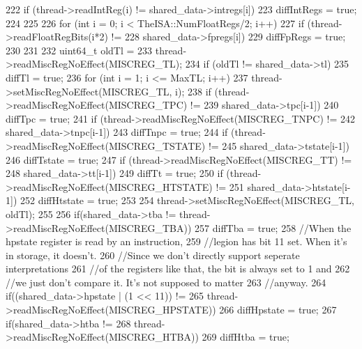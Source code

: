 \begin{DoxyCode}
{{{{{222                     if (thread->readIntReg(i) != shared_data->intregs[i]) {
223                         diffIntRegs = true;
224                     }
225                 }
226                 for (int i = 0; i < TheISA::NumFloatRegs/2; i++) {
227                     if (thread->readFloatRegBits(i*2) !=
228                             shared_data->fpregs[i]) {
229                         diffFpRegs = true;
230                     }
231                 }
232                         uint64_t oldTl =
233                             thread->readMiscRegNoEffect(MISCREG_TL);
234                 if (oldTl != shared_data->tl)
235                     diffTl = true;
236                 for (int i = 1; i <= MaxTL; i++) {
237                     thread->setMiscRegNoEffect(MISCREG_TL, i);
238                     if (thread->readMiscRegNoEffect(MISCREG_TPC) !=
239                             shared_data->tpc[i-1])
240                         diffTpc = true;
241                     if (thread->readMiscRegNoEffect(MISCREG_TNPC) !=
242                             shared_data->tnpc[i-1])
243                         diffTnpc = true;
244                     if (thread->readMiscRegNoEffect(MISCREG_TSTATE) !=
245                             shared_data->tstate[i-1])
246                         diffTstate = true;
247                     if (thread->readMiscRegNoEffect(MISCREG_TT) !=
248                             shared_data->tt[i-1])
249                         diffTt = true;
250                     if (thread->readMiscRegNoEffect(MISCREG_HTSTATE) !=
251                             shared_data->htstate[i-1])
252                         diffHtstate = true;
253                 }
254                 thread->setMiscRegNoEffect(MISCREG_TL, oldTl);
255 
256                 if(shared_data->tba != thread->readMiscRegNoEffect(MISCREG_TBA))
257                     diffTba = true;
258                 //When the hpstate register is read by an instruction,
259                 //legion has bit 11 set. When it's in storage, it doesn't.
260                 //Since we don't directly support seperate interpretations
261                 //of the registers like that, the bit is always set to 1 and
262                 //we just don't compare it. It's not supposed to matter
263                 //anyway.
264                 if((shared_data->hpstate | (1 << 11)) !=
265                         thread->readMiscRegNoEffect(MISCREG_HPSTATE))
266                     diffHpstate = true;
267                 if(shared_data->htba !=
268                         thread->readMiscRegNoEffect(MISCREG_HTBA))
269                     diffHtba = true;
}}}}
\end{DoxyCode}
